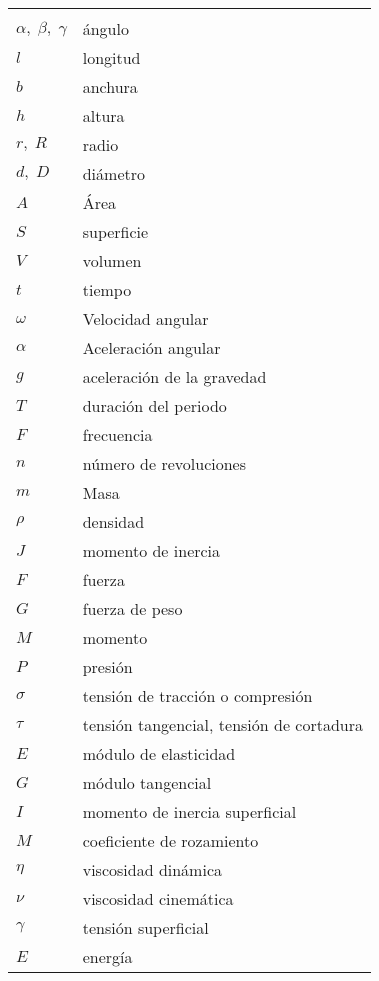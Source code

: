 \begin{mytable}[H]
	\centering
	\begin{tabular}{ll}
		\multicolumn{1}{c}{\quad\quad\quad} & \multicolumn{1}{c}{} \\
		$\alpha, \; \beta, \; \gamma$ & ángulo \\	
		$l$\quad\quad\quad& longitud \\
		$b$ & anchura \\
		$h$ & altura \\
		$r, \; R$ & radio \\
		$d,\; D$ & diámetro \\
		$A$ & Área \\
		$S$ & superficie \\
		$V$ & volumen \\
		$t$ & tiempo \\
		$\omega$ & Velocidad angular \\
		$\alpha$ & Aceleración angular \\
		$g$ & aceleración de la gravedad \\
		$T$ & duración del periodo \\
		$F$ & frecuencia \\
		$n$ & número de revoluciones \\
		$m$ & Masa \\
		$\rho$ & densidad \\
		$J$ & momento de inercia \\
		$F$ & fuerza \\
		$G$ & fuerza de peso \\
		$M$ & momento \\
		$P$ & presión \\
		$\sigma$ & tensión de tracción o compresión \\
		$\tau$ & tensión tangencial, tensión de cortadura \\
		$E$ & módulo de elasticidad \\
		$G$ & módulo tangencial \\
		$I$ & momento de inercia superficial \\
		$M$ & coeficiente de rozamiento \\
		$\eta$ & viscosidad dinámica \\
		$\nu$ & viscosidad cinemática \\
		$\gamma$ & tensión superficial \\
		$E$ & energía \\

\end{tabular}
\end{mytable}
